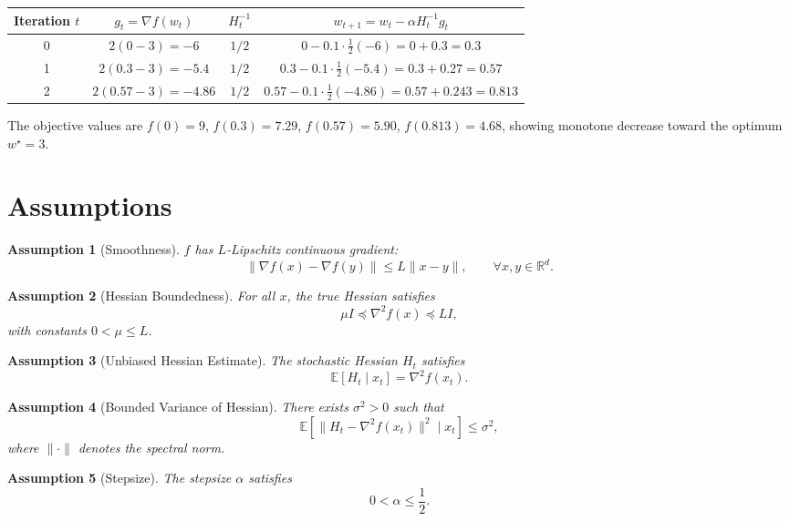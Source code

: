 \documentclass[11pt]{article}
\newtheorem{assumption}{Assumption}
\newcommand{\E}{\mathbb{E}}
\newcommand{\R}{\mathbb{R}}
\begin{document}
\begin{center}
\begin{tabular}{c|c|c|c}
Iteration $t$ & $g_{t}= \nabla f(w_{t})$ & $H_{t}^{-1}$ & $w_{t+1}=w_{t}-\alpha H_{t}^{-1}g_{t}$ \\ \hline
0 & $2(0-3)=-6$ & $1/2$ & $0-0.1\cdot\frac{1}{2}(-6)=0+0.3=0.3$ \\
1 & $2(0.3-3)=-5.4$ & $1/2$ & $0.3-0.1\cdot\frac{1}{2}(-5.4)=0.3+0.27=0.57$ \\
2 & $2(0.57-3)=-4.86$ & $1/2$ & $0.57-0.1\cdot\frac{1}{2}(-4.86)=0.57+0.243=0.813$ \\
\end{tabular}
\end{center}
The objective values are $f(0)=9$, $f(0.3)=7.29$, $f(0.57)=5.90$, $f(0.813)=4.68$,
showing monotone decrease toward the optimum $w^{\star}=3$.

\newpage
\section*{Assumptions}
\begin{assumption}[Smoothness]\label{ass:smooth}
$f$ has $L$‑Lipschitz continuous gradient:
\[
\|\nabla f(x)-\nabla f(y)\|\le L\|x-y\|,\qquad\forall x,y\in\R^{d}.
\]
\end{assumption}

\begin{assumption}[Hessian Boundedness]\label{ass:hessian}
For all $x$, the true Hessian satisfies
\[
\mu I \preceq \nabla^{2}f(x) \preceq L I,
\]
with constants $0<\mu\le L$.
\end{assumption}

\begin{assumption}[Unbiased Hessian Estimate]\label{ass:unbiased}
The stochastic Hessian $H_{t}$ satisfies
\[
\E[H_{t}\mid x_{t}]=\nabla^{2}f(x_{t}).
\]
\end{assumption}

\begin{assumption}[Bounded Variance of Hessian]\label{ass:var}
There exists $\sigma^{2}>0$ such that
\[
\E\!\left[\|H_{t}-\nabla^{2}f(x_{t})\|^{2}\mid x_{t}\right]\le\sigma^{2},
\]
where $\|\cdot\|$ denotes the spectral norm.
\end{assumption}

\begin{assumption}[Stepsize]\label{ass:step}
The stepsize $\alpha$ satisfies
\[
0<\alpha\le \frac{1}{2}.
\]
\end{assumption}
\end{document}
